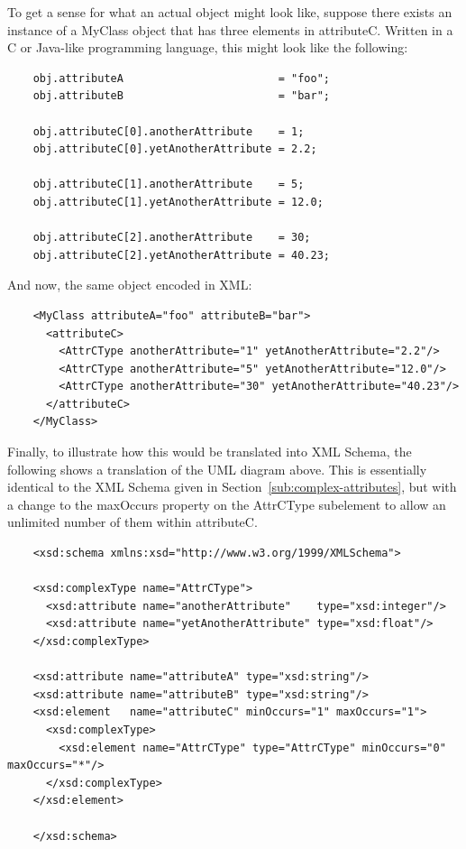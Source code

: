 \documentclass[10pt]{article}
\newcommand{\tightspacing}{\renewcommand{\baselinestretch}{0.85}}
\newcommand{\regularspacing}{\renewcommand{\baselinestretch}{1.0}}
\newcommand{\class}[1]{\textsf{#1}}
\newcommand{\attrib}[1]{\textsf{#1}}
\begin{document}
To get a sense for what an actual object might look like, suppose there
exists an instance of a \class{MyClass} object that has three elements in
\attrib{attributeC}.  Written in a C or Java-like programming language,
this might look like the following:
\begin{small}
\tightspacing
\begin{verbatim}
    obj.attributeA                        = "foo";
    obj.attributeB                        = "bar";

    obj.attributeC[0].anotherAttribute    = 1;
    obj.attributeC[0].yetAnotherAttribute = 2.2;

    obj.attributeC[1].anotherAttribute    = 5;
    obj.attributeC[1].yetAnotherAttribute = 12.0;

    obj.attributeC[2].anotherAttribute    = 30;
    obj.attributeC[2].yetAnotherAttribute = 40.23;
\end{verbatim}
\regularspacing
\end{small}
And now, the same object encoded in XML:
\begin{small}
  \tightspacing
\begin{verbatim}
    <MyClass attributeA="foo" attributeB="bar">
      <attributeC>
        <AttrCType anotherAttribute="1" yetAnotherAttribute="2.2"/>
        <AttrCType anotherAttribute="5" yetAnotherAttribute="12.0"/>
        <AttrCType anotherAttribute="30" yetAnotherAttribute="40.23"/>
      </attributeC>
    </MyClass>
\end{verbatim}
  \regularspacing
\end{small}

Finally, to illustrate how this would be translated into XML Schema, the
following shows a translation of the UML diagram above.  This is
essentially identical to the XML Schema given in
Section~\ref{sub:complex-attributes}, but with a change to the
\attrib{maxOccurs} property on the \class{AttrCType} subelement to allow an
unlimited number of them within \attrib{attributeC}.
  
\begin{small}
  \tightspacing
\begin{verbatim}
    <xsd:schema xmlns:xsd="http://www.w3.org/1999/XMLSchema">
    
    <xsd:complexType name="AttrCType">
      <xsd:attribute name="anotherAttribute"    type="xsd:integer"/>
      <xsd:attribute name="yetAnotherAttribute" type="xsd:float"/>
    </xsd:complexType>
    
    <xsd:attribute name="attributeA" type="xsd:string"/>
    <xsd:attribute name="attributeB" type="xsd:string"/>
    <xsd:element   name="attributeC" minOccurs="1" maxOccurs="1">
      <xsd:complexType>
        <xsd:element name="AttrCType" type="AttrCType" minOccurs="0" maxOccurs="*"/>
      </xsd:complexType>
    </xsd:element>
    
    </xsd:schema>
\end{verbatim}
  \regularspacing
\end{small}
\end{document}
